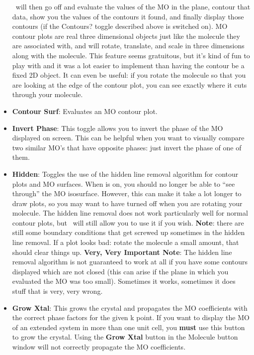\begin{itemize}
\viewprog\ will then go off and evaluate the values of the MO in the
plane, contour that data, show you the values of the contours it
found, and finally display those contours (if the {\sf Contours?}
toggle described above is switched on).  MO contour plots are real
three dimensional objects just like the molecule they are associated
with, and will rotate, translate, and scale in three dimensions along
with the molecule.  This feature seems gratuitous, but it's kind of
fun to play with and it was a lot easier to implement than having the
contour be a fixed 2D object.  It can even be useful:  if you rotate
the molecule so that you are looking at the edge of the contour plot,
you can see exactly where it cuts through your molecule.

\item {\bf Contour Surf}: Evaluates an MO contour plot.

\item {\bf Invert Phase}:  This toggle allows you to invert the phase
of the MO displayed on screen.  This can be helpful when you want to
visually compare two similar MO's that have opposite phases: just
invert the phase of one of them.

\item {\bf Hidden}:  Toggles the use of the hidden line removal
algorithm for contour plots and MO surfaces.  When  is
on, you should no longer be able to ``see through'' the MO isosurface.
However, this can make it take a lot longer to draw plots, so you may
want to have  turned off when you are rotating your
molecule.  The hidden line removal does not work particularly well for
normal contour plots, but \viewprog\ will still allow you to use it if
you wish. {\bf Note}: there are still some boundary conditions that
get screwed up sometimes in the hidden line removal.  If a plot looks
bad: rotate the molecule a small amount, that should clear things up.
{\bf Very, Very Important Note}:  The hidden line removal algorithm is
not guaranteed to work at all if you have some contours displayed
which are not closed (this can arise if the plane in which you
evaluated the MO was too small).   Sometimes it works, sometimes it
does stuff that is very, very wrong.  

\item {\bf Grow Xtal}:  This grows the crystal and propagates the MO
coefficients with the correct phase factors for the given k point.  If 
you want to display the MO of an extended system in more than one unit
cell, you {\bf must} use this button to grow the crystal.  Using the
{\bf Grow Xtal} button in the Molecule button window will not
correctly propagate the MO coefficients.

\end{itemize}


